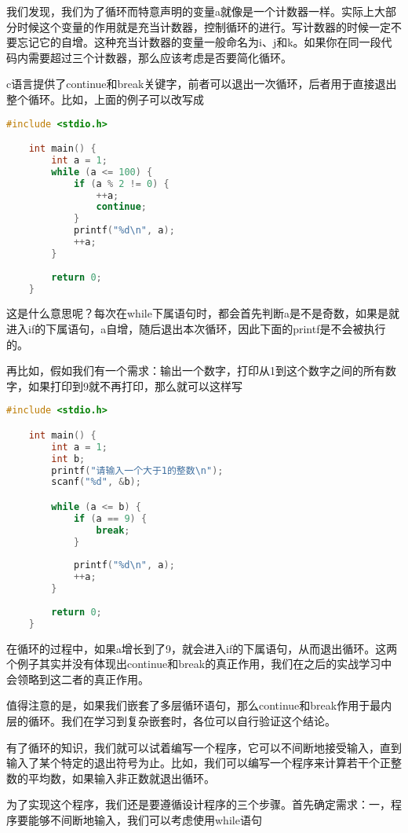 我们发现，我们为了循环而特意声明的变量a就像是一个计数器一样。实际上大部分时候这个变量的作用就是充当计数器，控制循环的进行。写计数器的时候一定不要忘记它的自增。这种充当计数器的变量一般命名为i、j和k。如果你在同一段代码内需要超过三个计数器，那么应该考虑是否要简化循环。

c语言提供了continue和break关键字，前者可以退出一次循环，后者用于直接退出整个循环。比如，上面的例子可以改写成

\begin{lstlisting}[language=C]
    #include <stdio.h>

    int main() {
        int a = 1;
        while (a <= 100) {
            if (a % 2 != 0) {
                ++a;
                continue;
            }
            printf("%d\n", a);
            ++a;
        }
        
        return 0;
    }
\end{lstlisting}

这是什么意思呢？每次在while下属语句时，都会首先判断a是不是奇数，如果是就进入if的下属语句，a自增，随后退出本次循环，因此下面的printf是不会被执行的。

再比如，假如我们有一个需求：输出一个数字，打印从1到这个数字之间的所有数字，如果打印到9就不再打印，那么就可以这样写

\begin{lstlisting}[language=C]
    #include <stdio.h>

    int main() {
        int a = 1;
        int b;
        printf("请输入一个大于1的整数\n");
        scanf("%d", &b);

        while (a <= b) {
            if (a == 9) {
                break;
            }
            
            printf("%d\n", a);
            ++a;
        }
        
        return 0;
    }
\end{lstlisting}

在循环的过程中，如果a增长到了9，就会进入if的下属语句，从而退出循环。这两个例子其实并没有体现出continue和break的真正作用，我们在之后的实战学习中会领略到这二者的真正作用。

值得注意的是，如果我们嵌套了多层循环语句，那么continue和break作用于最内层的循环。我们在学习到复杂嵌套时，各位可以自行验证这个结论。

有了循环的知识，我们就可以试着编写一个程序，它可以不间断地接受输入，直到输入了某个特定的退出符号为止。比如，我们可以编写一个程序来计算若干个正整数的平均数，如果输入非正数就退出循环。

为了实现这个程序，我们还是要遵循设计程序的三个步骤。首先确定需求：一，程序要能够不间断地输入，我们可以考虑使用while语句

